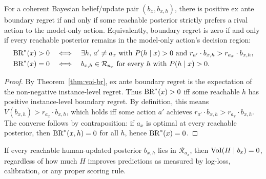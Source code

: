 \begin{theorem}\label{thm:facet-bridge}
For a coherent Bayesian belief/update pair $(b_x,b_{x,h})$, there is positive ex ante boundary regret if and only if some reachable posterior strictly prefers a rival action to the model-only action.
Equivalently, boundary regret is zero if and only if every reachable posterior remains in the model-only action's decision region:
\begin{equation}
    \begin{aligned}
    \operatorname{BR}^{*}(x) > 0
    &\quad\Longleftrightarrow\quad
        \exists h,\, a' \neq a_x
        \text{ with } P(h \mid x) > 0
        \text{ and }
        r_{a'} \cdot b_{x,h} > r_{a_x} \cdot b_{x,h},\\
    \operatorname{BR}^{*}(x) = 0
    &\quad\Longleftrightarrow\quad
        b_{x,h} \in \mathcal{R}_{a_x}
        \text{ for every } h \text{ with } P(h \mid x) > 0.
    \end{aligned}
\label{eq:facet-activation}
\end{equation}
\end{theorem}
\vspace{-1.25em}
\begin{proof}
By Theorem~\ref{thm:voi-br}, ex ante boundary regret is the expectation of the non-negative instance-level regret.
Thus $\operatorname{BR}^{*}(x) > 0$ iff some reachable $h$ has positive instance-level boundary regret.
By definition, this means $V(b_{x,h}) > r_{a_x} \cdot b_{x,h}$, which holds iff some action $a'$ achieves $r_{a'} \cdot b_{x,h} > r_{a_x} \cdot b_{x,h}$.
The converse follows by contraposition: if $a_x$ is optimal at every reachable posterior, then $\operatorname{BR}^{*}(x,h) = 0$ for all $h$, hence $\operatorname{BR}^{*}(x) = 0$.
\end{proof}

\begin{corollary}\label{cor:zero-dv}
If every reachable human-updated posterior $b_{x,h}$ lies in $\mathcal{R}_{a_x}$, then $\operatorname{VoI}(H \mid b_x) = 0$, regardless of how much $H$ improves predictions as measured by log-loss, calibration, or any proper scoring rule.
\end{corollary}

